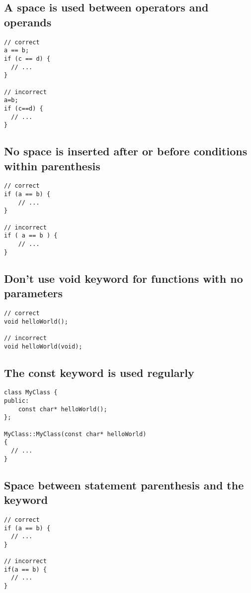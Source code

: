 \documentclass{article}
\begin{document}
\subsection{A space is used between operators and operands}

\begin{verbatim}
// correct
a == b;
if (c == d) {
  // ...
}

// incorrect
a=b;
if (c==d) {
  // ...
}
\end{verbatim}

\subsection{No space is inserted after or before conditions within parenthesis}

\begin{verbatim}
// correct
if (a == b) {
    // ...
}

// incorrect
if ( a == b ) {
    // ...
}
\end{verbatim}

\subsection{Don't use void keyword for functions with no parameters}

\begin{verbatim}
// correct
void helloWorld();

// incorrect
void helloWorld(void);
\end{verbatim}

\subsection{The const keyword is used regularly}

\begin{verbatim}
class MyClass {
public:
    const char* helloWorld();
};

MyClass::MyClass(const char* helloWorld)
{
  // ...
}
\end{verbatim}

\subsection{Space between statement parenthesis and the keyword}

\begin{verbatim}
// correct
if (a == b) {
  // ...
}

// incorrect
if(a == b) {
  // ...
}
\end{verbatim}
\end{document}
